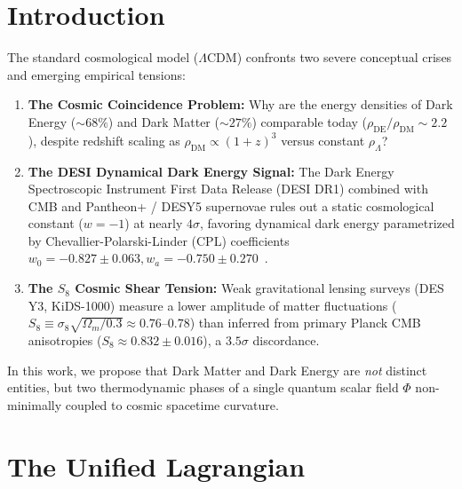 \documentclass[aps,prd,twocolumn,superscriptaddress,nofootinbib,floatfix,longbibliography]{revtex4-2}
\begin{document}

\maketitle

\section{Introduction}
\label{sec:intro}

The standard cosmological model ($\Lambda\text{CDM}$) confronts two severe conceptual crises and emerging empirical tensions:
\begin{enumerate}
\item \textbf{The Cosmic Coincidence Problem:} Why are the energy densities of Dark Energy ($\sim 68\%$) and Dark Matter ($\sim 27\%$) comparable today ($\rho_{\text{DE}}/\rho_{\text{DM}} \sim 2.2$), despite redshift scaling as $\rho_{\text{DM}} \propto (1+z)^3$ versus constant $\rho_\Lambda$?
\item \textbf{The DESI Dynamical Dark Energy Signal:} The Dark Energy Spectroscopic Instrument First Data Release (DESI DR1) combined with CMB and Pantheon+ / DESY5 supernovae rules out a static cosmological constant ($w = -1$) at nearly $4\sigma$, favoring dynamical dark energy parametrized by Chevallier-Polarski-Linder (CPL) coefficients $w_0 = -0.827 \pm 0.063, w_a = -0.750 \pm 0.270$~\cite{Planck2020}.
\item \textbf{The $S_8$ Cosmic Shear Tension:} Weak gravitational lensing surveys (DES Y3, KiDS-1000) measure a lower amplitude of matter fluctuations ($S_8 \equiv \sigma_8 \sqrt{\Omega_m/0.3} \approx 0.76\text{--}0.78$) than inferred from primary Planck CMB anisotropies ($S_8 \approx 0.832 \pm 0.016$), a $3.5\sigma$ discordance.
\end{enumerate}

In this work, we propose that Dark Matter and Dark Energy are \textit{not} distinct entities, but two thermodynamic phases of a single quantum scalar field $\Phi$ non-minimally coupled to cosmic spacetime curvature.

\section{The Unified Lagrangian}
\label{sec:lagrangian}
\end{document}
